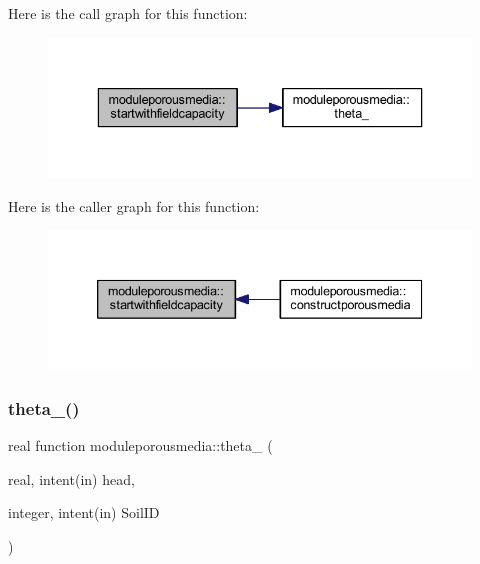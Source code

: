 Here is the call graph for this function\+:\nopagebreak
\begin{figure}[H]
\begin{center}
\leavevmode
\includegraphics[width=336pt]{namespacemoduleporousmedia_af2c381d3df927d5f0eb263a6fe3b13a7_cgraph}
\end{center}
\end{figure}
Here is the caller graph for this function\+:\nopagebreak
\begin{figure}[H]
\begin{center}
\leavevmode
\includegraphics[width=339pt]{namespacemoduleporousmedia_af2c381d3df927d5f0eb263a6fe3b13a7_icgraph}
\end{center}
\end{figure}
\mbox{\label{namespacemoduleporousmedia_a61fe4c9d6a8bf021bfbb5ae3ba5e548e}} 
\subsubsection{\texorpdfstring{theta\+\_\+()}{theta\_()}}
{\footnotesize\ttfamily real function moduleporousmedia\+::theta\+\_\+ (\begin{DoxyParamCaption}\item[{real, intent(in)}]{head,  }\item[{integer, intent(in)}]{Soil\+ID }\end{DoxyParamCaption})\hspace{0.3cm}{\ttfamily [private]}}

